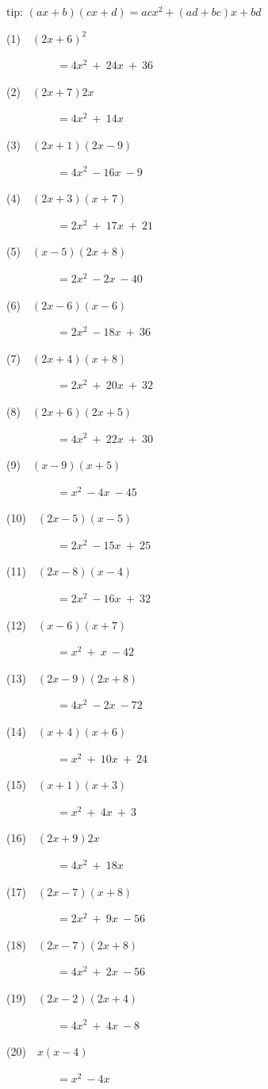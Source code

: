 \documentclass[a4j,twocolumn,10pt,fleqn]{jarticle}
\begin{document}
tip: $(ax + b)(cx + d) = acx^2 + (ad + bc)x + bd$

(1)~~$(2x+6)^2$

~~~~~~~~~$=4x^2~+~24x~+~36$

(2)~~$(2x+7)2x$

~~~~~~~~~$=4x^2~+~14x$

(3)~~$(2x+1)(2x-9)$

~~~~~~~~~$=4x^2~-16x~-9$

(4)~~$(2x+3)(x+7)$

~~~~~~~~~$=2x^2~+~17x~+~21$

(5)~~$(x-5)(2x+8)$

~~~~~~~~~$=2x^2~-2x~-40$

(6)~~$(2x-6)(x-6)$

~~~~~~~~~$=2x^2~-18x~+~36$

(7)~~$(2x+4)(x+8)$

~~~~~~~~~$=2x^2~+~20x~+~32$

(8)~~$(2x+6)(2x+5)$

~~~~~~~~~$=4x^2~+~22x~+~30$

(9)~~$(x-9)(x+5)$

~~~~~~~~~$=x^2~-4x~-45$

(10)~~$(2x-5)(x-5)$

~~~~~~~~~$=2x^2~-15x~+~25$

(11)~~$(2x-8)(x-4)$

~~~~~~~~~$=2x^2~-16x~+~32$

(12)~~$(x-6)(x+7)$

~~~~~~~~~$=x^2~+~x~-42$

(13)~~$(2x-9)(2x+8)$

~~~~~~~~~$=4x^2~-2x~-72$

(14)~~$(x+4)(x+6)$

~~~~~~~~~$=x^2~+~10x~+~24$

(15)~~$(x+1)(x+3)$

~~~~~~~~~$=x^2~+~4x~+~3$

(16)~~$(2x+9)2x$

~~~~~~~~~$=4x^2~+~18x$

(17)~~$(2x-7)(x+8)$

~~~~~~~~~$=2x^2~+~9x~-56$

(18)~~$(2x-7)(2x+8)$

~~~~~~~~~$=4x^2~+~2x~-56$

(19)~~$(2x-2)(2x+4)$

~~~~~~~~~$=4x^2~+~4x~-8$

(20)~~$x(x-4)$

~~~~~~~~~$=x^2~-4x$
\end{document}
